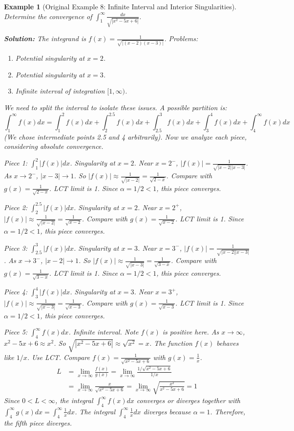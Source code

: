 \documentclass[11pt]{article}
\theoremstyle{mytheoremstyle}
\theoremstyle{mydefinitionstyle}
\newtheorem{example}[theorem]{Example}
\begin{document}
\begin{example}[Original Example 8: Infinite Interval and Interior Singularities]
Determine the convergence of $\int_1^\infty \frac{dx}{\sqrt{|x^2-5x+6|}}$.

\textbf{Solution:}
The integrand is $f(x) = \frac{1}{\sqrt{|(x-2)(x-3)|}}$.
Problems:
\begin{enumerate}
    \item Potential singularity at $x=2$.
    \item Potential singularity at $x=3$.
    \item Infinite interval of integration $[1, \infty)$.
\end{enumerate}
We need to split the interval to isolate these issues. A possible partition is:
\[ \int_1^\infty f(x) dx = \int_1^2 f(x) dx + \int_2^{2.5} f(x) dx + \int_{2.5}^3 f(x) dx + \int_3^4 f(x) dx + \int_4^\infty f(x) dx \]
(We chose intermediate points 2.5 and 4 arbitrarily). Now we analyze each piece, considering absolute convergence.

\emph{Piece 1: $\int_1^2 |f(x)| dx$.} Singularity at $x=2$.
Near $x=2^-$, $|f(x)| = \frac{1}{\sqrt{|x-2||x-3|}}$. As $x \to 2^-$, $|x-3| \to 1$. So $|f(x)| \approx \frac{1}{\sqrt{|x-2|}} = \frac{1}{\sqrt{2-x}}$. Compare with $g(x) = \frac{1}{\sqrt{2-x}}$. LCT limit is 1. Since $\alpha = 1/2 < 1$, this piece converges.

\emph{Piece 2: $\int_2^{2.5} |f(x)| dx$.} Singularity at $x=2$.
Near $x=2^+$, $|f(x)| \approx \frac{1}{\sqrt{|x-2|}} = \frac{1}{\sqrt{x-2}}$. Compare with $g(x) = \frac{1}{\sqrt{x-2}}$. LCT limit is 1. Since $\alpha = 1/2 < 1$, this piece converges.

\emph{Piece 3: $\int_{2.5}^3 |f(x)| dx$.} Singularity at $x=3$.
Near $x=3^-$, $|f(x)| = \frac{1}{\sqrt{|x-2||x-3|}}$. As $x \to 3^-$, $|x-2| \to 1$. So $|f(x)| \approx \frac{1}{\sqrt{|x-3|}} = \frac{1}{\sqrt{3-x}}$. Compare with $g(x) = \frac{1}{\sqrt{3-x}}$. LCT limit is 1. Since $\alpha = 1/2 < 1$, this piece converges.

\emph{Piece 4: $\int_3^4 |f(x)| dx$.} Singularity at $x=3$.
Near $x=3^+$, $|f(x)| \approx \frac{1}{\sqrt{|x-3|}} = \frac{1}{\sqrt{x-3}}$. Compare with $g(x) = \frac{1}{\sqrt{x-3}}$. LCT limit is 1. Since $\alpha = 1/2 < 1$, this piece converges.

\emph{Piece 5: $\int_4^\infty f(x) dx$.} Infinite interval. Note $f(x)$ is positive here.
As $x \to \infty$, $x^2-5x+6 \approx x^2$. So $\sqrt{|x^2-5x+6|} \approx \sqrt{x^2} = x$. The function $f(x)$ behaves like $1/x$.
Use LCT. Compare $f(x) = \frac{1}{\sqrt{x^2-5x+6}}$ with $g(x) = \frac{1}{x}$.
\begin{align*} L &= \lim_{x \to \infty} \frac{f(x)}{g(x)} = \lim_{x \to \infty} \frac{1/\sqrt{x^2-5x+6}}{1/x} \\ &= \lim_{x \to \infty} \frac{x}{\sqrt{x^2-5x+6}} = \lim_{x \to \infty} \sqrt{\frac{x^2}{x^2-5x+6}} = 1 \end{align*}
Since $0 < L < \infty$, the integral $\int_4^\infty f(x) dx$ converges or diverges together with $\int_4^\infty g(x) dx = \int_4^\infty \frac{1}{x} dx$.
The integral $\int_4^\infty \frac{1}{x} dx$ diverges because $\alpha = 1$.
Therefore, the fifth piece diverges.


\end{example}
\end{document}
